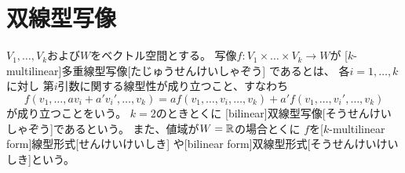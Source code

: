\documentclass[report]{jlreq}
\begin{document}
%
\section{双線型写像}


\begin{definition}[多重線型写像]
    $V_1, \dots, V_k$および$W$をベクトル空間とする。
    写像$f \colon V_1 \times \dots \times V_k \to W$が
    [$k$-multilinear]{多重線型写像}[たじゅうせんけいしゃぞう]
    であるとは、
    各$i = 1, \dots, k$に対し
    第$i$引数に関する線型性が成り立つこと、すなわち
    \begin{equation}
        f(v_1, \dots, a v_i + a' v_i' , \dots, v_k)
            = a f(v_1, \dots, v_i, \dots, v_k) + a' f(v_1, \dots, v_i', \dots, v_k)
    \end{equation}
    が成り立つことをいう。
    $k = 2$のときとくに
    [bilinear]{双線型写像}[そうせんけいしゃぞう]であるという。
    また、値域が$W = \mathbb{R}$の場合とくに
    $f$を[$k$-multilinear form]{線型形式}[せんけいけいしき]
    や[bilinear form]{双線型形式}[そうせんけいけいしき]という。
\end{definition}

\end{document}
